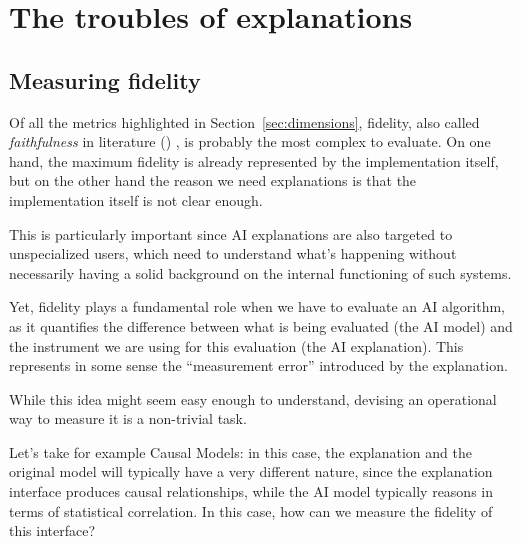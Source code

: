 \documentclass[conference]{IEEEtran}
\begin{document}
\section{The troubles of explanations}
\label{sec:troubles}

\subsection{Measuring fidelity}
\label{sec:fidelity}

Of all the metrics highlighted in Section~\ref{sec:dimensions}, fidelity, also
called \textit{faithfulness} in literature (\cite{explainingexpl}) , is
probably the most complex to evaluate. On one hand, the maximum fidelity is
already represented by the implementation itself, but on the other hand the
reason we need explanations is that the implementation itself is not clear
enough.

This is particularly important since AI explanations are also targeted to
unspecialized users, which need to understand what's happening without
necessarily having a solid background on the internal functioning of such
systems.

Yet, fidelity plays a fundamental role when we have to evaluate an AI algorithm,
as it quantifies the difference between what is being evaluated (the AI model)
and the instrument we are using for this evaluation (the AI explanation). This represents in some sense the
``measurement error'' introduced by the explanation.



While this idea might seem easy enough to understand, devising an operational
way to measure it is a non-trivial task.

Let's take for example Causal Models: in this case, the explanation and the
original model will typically have a very different nature, since the
explanation interface produces causal relationships, while the AI model
typically reasons in terms of statistical correlation. In this case, how can we
measure the fidelity of this interface?
\end{document}
